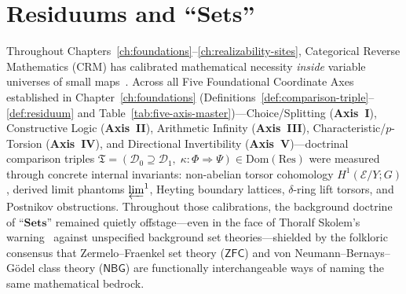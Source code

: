 \chapter{\texorpdfstring{Residuums and ``$\mathbf{Sets}$''}{Residuums and "Sets"}}
\label{ch:sets-residuum}

Throughout Chapters~\ref{ch:foundations}--\ref{ch:realizability-sites}, Categorical Reverse Mathematics ($\mathrm{CRM}$) has calibrated mathematical necessity \emph{inside} variable universes of small maps~\cite{Lawvere69,Johnstone02}. Across all Five Foundational Coordinate Axes established in Chapter~\ref{ch:foundations} (Definitions~\ref{def:comparison-triple}--\ref{def:residuum} and Table~\ref{tab:five-axis-master})---Choice/Splitting (\textbf{Axis~I}), Constructive Logic (\textbf{Axis~II}), Arithmetic Infinity (\textbf{Axis~III}), Characteristic/$p$-Torsion (\textbf{Axis~IV}), and Directional Invertibility (\textbf{Axis~V})---doctrinal comparison triples $\mathfrak{T} = (\mathcal{D}_0 \supseteq \mathcal{D}_1,\; \kappa : \Phi \Rightarrow \Psi) \in \mathrm{Dom}(\mathrm{Res})$ were measured through concrete internal invariants: non-abelian torsor cohomology $H^1(\mathcal{E}/Y; G)$, derived limit phantoms $\varprojlim^1$, Heyting boundary lattices, $\delta$-ring lift torsors, and Postnikov obstructions. Throughout those calibrations, the background doctrine of ``$\mathbf{Sets}$'' remained quietly offstage---even in the face of Thoralf Skolem's warning~\cite{Skolem55} against unspecified background set theories---shielded by the folkloric consensus that Zermelo--Fraenkel set theory ($\mathsf{ZFC}$) and von Neumann--Bernays--G\"odel class theory ($\mathsf{NBG}$) are functionally interchangeable ways of naming the same mathematical bedrock.

